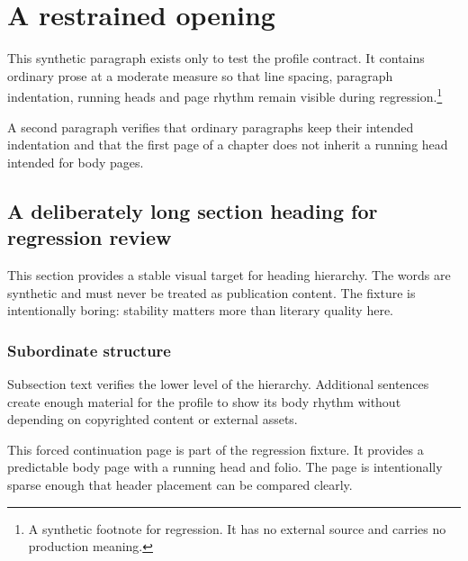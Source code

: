 \chapter{A restrained opening}

This synthetic paragraph exists only to test the profile contract. It contains ordinary prose at a moderate measure so that line spacing, paragraph indentation, running heads and page rhythm remain visible during regression.\footnote{A synthetic footnote for regression. It has no external source and carries no production meaning.}

A second paragraph verifies that ordinary paragraphs keep their intended indentation and that the first page of a chapter does not inherit a running head intended for body pages.

\section{A deliberately long section heading for regression review}

This section provides a stable visual target for heading hierarchy. The words are synthetic and must never be treated as publication content. The fixture is intentionally boring: stability matters more than literary quality here.

\subsection{Subordinate structure}

Subsection text verifies the lower level of the hierarchy. Additional sentences create enough material for the profile to show its body rhythm without depending on copyrighted content or external assets.

\newpage
This forced continuation page is part of the regression fixture. It provides a predictable body page with a running head and folio. The page is intentionally sparse enough that header placement can be compared clearly.
